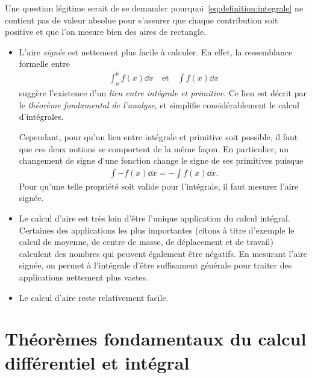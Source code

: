 \documentclass[main.tex]{subfiles}
\begin{document}
\begin{question}

    Une question légitime serait de se demander pourquoi~\eqref{eq:definition:integrale} ne contient pas de valeur absolue
    pour s'assurer que chaque contribution soit positive
    et que l'on mesure bien des aires de rectangle.

    \begin{itemize}
        \item L'aire \emph{signée} est nettement plus facile à calculer.
            En effet, la ressemblance formelle entre
            \begin{align}
                \int_a^b f(x) \dd x
                \quad \text{et} \quad
                \int f(x) \dd x
            \end{align}
            suggère l'existence d'un \emph{lien entre intégrale et primitive}.
            Ce lien est décrit par le \emph{théorème fondamental de l'analyse},
            et simplifie considérablement le calcul d'intégrales.

            Cependant, pour qu'un lien entre intégrale et primitive soit possible,
            il faut que ces deux notions se comportent de la même façon.
            En particulier,
            un changement de signe d'une fonction
            change le signe de ses primitives puisque
            \begin{align}
                \int -f(x) \dd x = - \int f(x) \dd x.
            \end{align}
            Pour qu'une telle propriété soit valide pour l'intégrale,
            il faut mesurer l'aire signée.
        \item Le calcul d'aire est très loin d'être l'unique application du calcul intégral.
            Certaines des applications les plus importantes
            (citons à titre d'exemple le calcul de moyenne, de centre de masse, de déplacement et de travail)
            calculent des nombres qui peuvent également être négatifs.
            En mesurant l'aire signée,
            on permet à l'intégrale d'être suffisament générale pour traiter des applications nettement plus vastes.
        \item Le calcul d'aire reste relativement facile.
    \end{itemize}
\end{question}

\section{Théorèmes fondamentaux du calcul différentiel et intégral}
\end{document}
